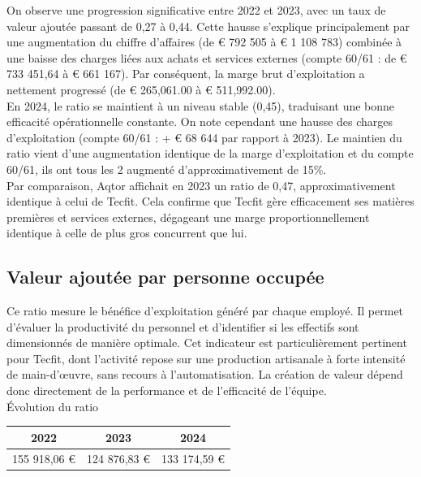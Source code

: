 On observe une progression significative entre 2022 et 2023, avec un taux de valeur ajoutée passant de 0,27 à 0,44. Cette hausse s’explique principalement par une augmentation du chiffre d’affaires (de € 792 505 à € 1 108 783) combinée à une baisse des charges liées aux achats et services externes (compte 60/61 : de € 733 451,64 à € 661 167). Par conséquent, la marge brut d’exploitation a nettement progressé (de € 265,061.00 à € 511,992.00).\\
En 2024, le ratio se maintient à un niveau stable (0,45), traduisant une bonne efficacité opérationnelle constante. On note cependant une hausse des charges d’exploitation (compte 60/61 : + € 68 644 par rapport à 2023). Le maintien du ratio vient d’une augmentation identique de la marge d’exploitation et du compte 60/61, ils ont tous les 2 augmenté d’approximativement de 15\%.\\
Par comparaison, Aqtor affichait en 2023 un ratio de 0,47, approximativement identique à celui de Tecfit. Cela confirme que Tecfit gère efficacement ses matières premières et services externes, dégageant une marge proportionnellement identique à celle de plus gros concurrent que lui.


\subsection{Valeur ajoutée par personne occupée}
Ce ratio mesure le bénéfice d’exploitation généré par chaque employé. Il permet d’évaluer la productivité du personnel et d’identifier si les effectifs sont dimensionnés de manière optimale. Cet indicateur est particulièrement pertinent pour Tecfit, dont l’activité repose sur une production artisanale à forte intensité de main-d’œuvre, sans recours à l’automatisation. La création de valeur dépend donc directement de la performance et de l’efficacité de l’équipe.\\
Évolution du ratio\\

\begin{table}[h]
\centering
\begin{tabular}{c|c|c}
\textbf{2022} & \textbf{2023} & \textbf{2024} \\
\hline
155 918,06 € & 124 876,83 € & 133 174,59 € \\
\end{tabular}
\end{table}

